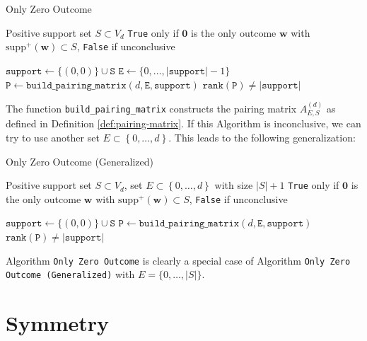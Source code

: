 \begin{algorithm}[H]
\caption{Only Zero Outcome}\label{alg:hyperfield_criterion:is_zero}
    \begin{algorithmic}[1]
    \Require Positive support set $S \subset {V_d}$
    \Ensure \texttt{True} only if \( \mathbf{0} \) is the only outcome \( \mathbf{w} \) with \( \mathrm{supp}^+(\mathbf{w}) \subset S \), \texttt{False} if unconclusive

    \State $\texttt{support} \gets \{(0,0)\} \cup \texttt{S}$
    \State $\texttt{E} \gets \{0, \dots, |\texttt{support}| - 1\}$
    \State $\texttt{P} \gets \texttt{build\_pairing\_matrix}(d, \texttt{E}, \texttt{support})$    
    \State \Return $\texttt{rank}(\texttt{P}) \neq |\texttt{support}|$
    \end{algorithmic}  
\end{algorithm}

The function \texttt{build\_pairing\_matrix} constructs the pairing matrix \( A^{(d)}_{E,S} \) as defined in Definition \ref{def:pairing-matrix}. If this Algorithm is inconclusive, we can try to use another set \( E \subset \left\{ 0, \dots, d \right\} \). This leads to the following generalization:

\begin{algorithm}[H]
\caption{Only Zero Outcome (Generalized)}\label{alg:hyperfield_criterion:is_zero_general}
    \begin{algorithmic}[1]
    \Require Positive support set $S \subset {V_d}$, set \( E \subset \left\{ 0, \dots, d \right\} \) with size \( \lvert S \vert + 1 \)
    \Ensure \texttt{True} only if \( \mathbf{0} \) is the only outcome \( \mathbf{w} \) with \( \mathrm{supp}^+(\mathbf{w}) \subset S \), \texttt{False} if unconclusive

    \State $\texttt{support} \gets \{(0,0)\} \cup \texttt{S}$
    \State $\texttt{P} \gets \texttt{build\_pairing\_matrix}(d, \texttt{E}, \texttt{support})$    
    \State \Return $\texttt{rank}(\texttt{P}) \neq |\texttt{support}|$
    \end{algorithmic}  
\end{algorithm}

Algorithm \texttt{Only Zero Outcome} is clearly a special case of Algorithm \texttt{Only Zero Outcome (Generalized)} with \( E =  \{0, \dots, |{S}|\}\).

\section{Symmetry}

